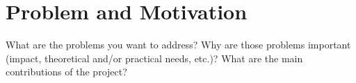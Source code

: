 \section{Problem and Motivation}
\label{problem-and-motivation}

What are the problems you want to address? Why are those problems
important (impact, theoretical and/or practical needs, etc.)? What are
the main contributions of the project?
